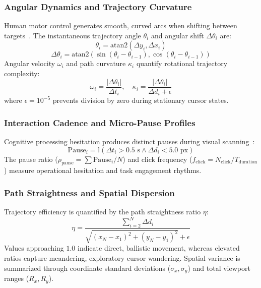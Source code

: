 \documentclass[10pt,journal,compsoc]{IEEEtran}
\begin{document}
\subsubsection{Angular Dynamics and Trajectory Curvature}
Human motor control generates smooth, curved arcs when shifting between targets~\cite{kumar2024preventing}. The instantaneous trajectory angle $\theta_i$ and angular shift $\Delta \theta_i$ are:
\begin{equation}
\theta_i = \text{atan2}(\Delta y_i, \Delta x_i)
\end{equation}
\begin{equation}
\Delta \theta_i = \text{atan2}(\sin(\theta_i - \theta_{i-1}), \cos(\theta_i - \theta_{i-1}))
\end{equation}
Angular velocity $\omega_i$ and path curvature $\kappa_i$ quantify rotational trajectory complexity:
\begin{equation}
\omega_i = \frac{|\Delta \theta_i|}{\Delta t_i}, \quad \kappa_i = \frac{|\Delta \theta_i|}{\Delta d_i + \epsilon}
\end{equation}
where $\epsilon = 10^{-5}$ prevents division by zero during stationary cursor states.

\subsubsection{Interaction Cadence and Micro-Pause Profiles}
Cognitive processing hesitation produces distinct pauses during visual scanning~\cite{gomez2022evaluating}:
\begin{equation}
\text{Pause}_i = \mathbb{I}(\Delta t_i > 0.5\text{ s} \land \Delta d_i < 5.0\text{ px})
\end{equation}
The pause ratio ($\rho_{\text{pause}} = \sum \text{Pause}_i / N$) and click frequency ($f_{\text{click}} = N_{\text{click}} / T_{\text{duration}}$) measure operational hesitation and task engagement rhythms.

\subsubsection{Path Straightness and Spatial Dispersion}
Trajectory efficiency is quantified by the path straightness ratio $\eta$:
\begin{equation}
\eta = \frac{\sum_{i=2}^N \Delta d_i}{\sqrt{(x_N - x_1)^2 + (y_N - y_1)^2} + \epsilon}
\end{equation}
Values approaching $1.0$ indicate direct, ballistic movement, whereas elevated ratios capture meandering, exploratory cursor wandering. Spatial variance is summarized through coordinate standard deviations ($\sigma_x, \sigma_y$) and total viewport ranges ($R_x, R_y$).
\end{document}
